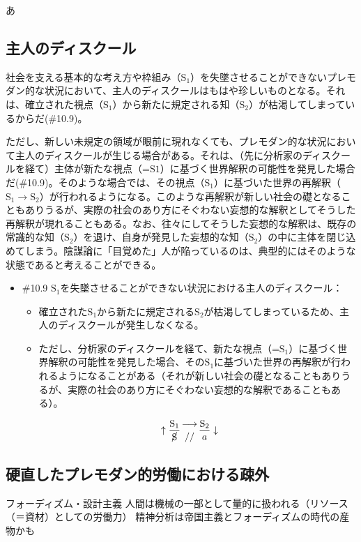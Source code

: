 あ

\subsection{主人のディスクール}\label{ux4e3bux4ebaux306eux30c7ux30a3ux30b9ux30afux30fcux30eb}

社会を支える基本的な考え方や枠組み（\(\textrm{S}_1\)）を失墜させることができないプレモダン的な状況において、主人のディスクールはもはや珍しいものとなる。それは、確立された視点（\(\textrm{S}_1\)）から新たに規定される知（\(\textrm{S}_2\)）が枯渇してしまっているからだ(\#10.9)。

ただし、新しい未規定の領域が眼前に現れなくても、プレモダン的な状況において主人のディスクールが生じる場合がある。それは、（先に分析家のディスクールを経て）主体が新たな視点（=\(\textrm{S}1\)）に基づく世界解釈の可能性を発見した場合だ(\#10.9)。そのような場合では、その視点（\(\textrm{S}_1\)）に基づいた世界の再解釈（\(\textrm{S}_1\rightarrow\textrm{S}_2\)）が行われるようになる。このような再解釈が新しい社会の礎となることもありうるが、実際の社会のあり方にそぐわない妄想的な解釈としてそうした再解釈が現れることもある。なお、往々にしてそうした妄想的な解釈は、既存の常識的な知（\(\textrm{S}_2\)）を退け、自身が発見した妄想的な知（\(\textrm{S}_2\)）の中に主体を閉じ込めてしまう。陰謀論に「目覚めた」人が陥っているのは、典型的にはそのような状態であると考えることができる。

\begin{note}{}
  \begin{itemize}
    \tightlist
    \item{\#10.9} $\textrm{S}_1$を失墜させることができない状況における主人のディスクール：
      \begin{itemize}
        \tightlist
        \item 確立された$\textrm{S}_1$から新たに規定される$\textrm{S}_2$が枯渇してしまっているため、主人のディスクールが発生しなくなる。
        \item ただし、分析家のディスクールを経て、新たな視点（=$\textrm{S}_1$）に基づく世界解釈の可能性を発見した場合、その$\textrm{S}_1$に基づいた世界の再解釈が行われるようになることがある（それが新しい社会の礎となることもありうるが、実際の社会のあり方にそぐわない妄想的な解釈であることもある）。
      \end{itemize}

$$
\uparrow\frac{\mathrm{S_1}}{\cancel{\textrm{S}}}\genfrac{}{}{0pt}{}{\longrightarrow}{//}\frac{\mathrm{S_2}}{a}\downarrow
$$
  \end{itemize}
\end{note}

\subsection{硬直したプレモダン的労働における疎外}\label{ux786cux76f4ux3057ux305fux30d7ux30ecux30e2ux30c0ux30f3ux7684ux52b4ux50cdux306bux304aux3051ux308bux758eux5916}

フォーディズム・設計主義
人間は機械の一部として量的に扱われる（リソース（＝資材）としての労働力）
精神分析は帝国主義とフォーディズムの時代の産物かも
